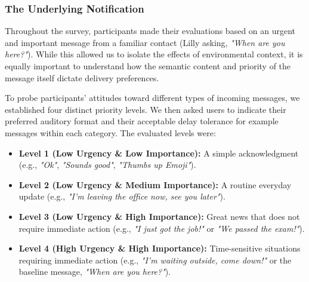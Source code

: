 \subsubsection{The Underlying Notification}
\label{sec:underlying_notification}

Throughout the survey, participants made their evaluations based on an urgent and important message from a familiar contact (Lilly asking, \textit{"When are you here?"}). While this allowed us to isolate the effects of environmental context, it is equally important to understand how the semantic content and priority of the message itself dictate delivery preferences. 

To probe participants' attitudes toward different types of incoming messages, we established four distinct priority levels. We then asked users to indicate their preferred auditory format and their acceptable delay tolerance for example messages within each category. The evaluated levels were:
\begin{itemize}
    \item \textbf{Level 1 (Low Urgency \& Low Importance):} A simple acknowledgment (e.g., \textit{"Ok"}, \textit{"Sounds good"}, \textit{"Thumbs up Emoji"}).
    \item \textbf{Level 2 (Low Urgency \& Medium Importance):} A routine everyday update (e.g., \textit{"I'm leaving the office now, see you later"}).
    \item \textbf{Level 3 (Low Urgency \& High Importance):} Great news that does not require immediate action (e.g., \textit{"I just got the job!"} or \textit{"We passed the exam!"}).
    \item \textbf{Level 4 (High Urgency \& High Importance):} Time-sensitive situations requiring immediate action (e.g., \textit{"I'm waiting outside, come down!"} or the baseline message, \textit{"When are you here?"}).
\end{itemize}

